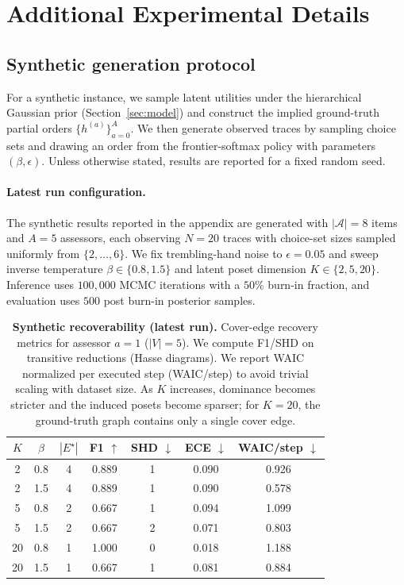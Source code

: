 \section{Additional Experimental Details}
\label{app:recoverability_extra}

\subsection{Synthetic generation protocol}
\label{app:synthetic_protocol}
For a synthetic instance, we sample latent utilities under the hierarchical Gaussian prior
(Section~\ref{sec:model}) and construct the implied ground-truth partial orders
$\{h^{(a)}\}_{a=0}^A$.
We then generate observed traces by sampling choice sets and drawing an order from the
frontier-softmax policy with parameters $(\beta,\epsilon)$.
Unless otherwise stated, results are reported for a fixed random seed.

\paragraph{Latest run configuration.}
The synthetic results reported in the appendix are generated with $|\mathcal{A}|=8$ items and
$A=5$ assessors, each observing $N=20$ traces with choice-set sizes sampled uniformly from
$\{2,\dots,6\}$.
We fix trembling-hand noise to $\epsilon=0.05$ and sweep inverse temperature
$\beta\in\{0.8,1.5\}$ and latent poset dimension $K\in\{2,5,20\}$.
Inference uses $100{,}000$ MCMC iterations with a $50\%$ burn-in fraction, and evaluation uses
$500$ post burn-in posterior samples.

\begin{table}[t]
\centering
\caption{\textbf{Synthetic recoverability (latest run).} Cover-edge recovery metrics for assessor $a=1$
($|V|=5$). We compute F1/SHD on transitive reductions (Hasse diagrams). We report WAIC normalized per executed
step (WAIC/step) to avoid trivial scaling with dataset size. As $K$ increases, dominance becomes stricter and
the induced posets become sparser; for $K=20$, the ground-truth graph contains only a single cover edge.}
\label{tab:synthetic_latest_run}
\begin{small}
\begin{tabular}{ccccccc}
\toprule
$K$ & $\beta$ & $|E^\star|$ & F1 $\uparrow$ & SHD $\downarrow$ & ECE $\downarrow$ & WAIC/step $\downarrow$ \\
\midrule
2  & 0.8 & 4 & 0.889 & 1 & 0.090 & 0.926 \\
2  & 1.5 & 4 & 0.889 & 1 & 0.090 & 0.578 \\
5  & 0.8 & 2 & 0.667 & 1 & 0.094 & 1.099 \\
5  & 1.5 & 2 & 0.667 & 2 & 0.071 & 0.803 \\
20 & 0.8 & 1 & 1.000 & 0 & 0.018 & 1.188 \\
20 & 1.5 & 1 & 0.667 & 1 & 0.081 & 0.884 \\
\bottomrule
\end{tabular}
\end{small}
\end{table}

